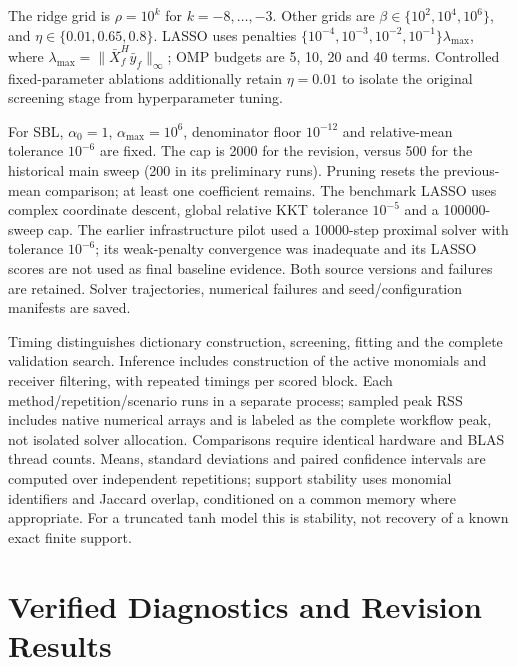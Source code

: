 \documentclass[conference]{IEEEtran}
\begin{document}
The ridge grid is $\rho=10^k$ for $k=-8,\ldots,-3$. Other grids are $\beta\in\{10^2,10^4,10^6\}$, and $\eta\in\{0.01,0.65,0.8\}$. LASSO uses penalties $\{10^{-4},10^{-3},10^{-2},10^{-1}\}\lambda_{\max}$, where $\lambda_{\max}=\|\bar X_f^H\bar y_f\|_\infty$; OMP budgets are 5, 10, 20 and 40 terms. Controlled fixed-parameter ablations additionally retain $\eta=0.01$ to isolate the original screening stage from hyperparameter tuning.

For SBL, $\alpha_0=1$, $\alpha_{\max}=10^6$, denominator floor $10^{-12}$ and relative-mean tolerance $10^{-6}$ are fixed. The cap is 2000 for the revision, versus 500 for the historical main sweep (200 in its preliminary runs). Pruning resets the previous-mean comparison; at least one coefficient remains. The benchmark LASSO uses complex coordinate descent, global relative KKT tolerance $10^{-5}$ and a 100000-sweep cap. The earlier infrastructure pilot used a 10000-step proximal solver with tolerance $10^{-6}$; its weak-penalty convergence was inadequate and its LASSO scores are not used as final baseline evidence. Both source versions and failures are retained. Solver trajectories, numerical failures and seed/configuration manifests are saved.

Timing distinguishes dictionary construction, screening, fitting and the complete validation search. Inference includes construction of the active monomials and receiver filtering, with repeated timings per scored block. Each method/repetition/scenario runs in a separate process; sampled peak RSS includes native numerical arrays and is labeled as the complete workflow peak, not isolated solver allocation. Comparisons require identical hardware and BLAS thread counts. Means, standard deviations and paired confidence intervals are computed over independent repetitions; support stability uses monomial identifiers and Jaccard overlap, conditioned on a common memory where appropriate. For a truncated tanh model this is stability, not recovery of a known exact finite support.

\section{Verified Diagnostics and Revision Results}\label{sec:results}
\end{document}
